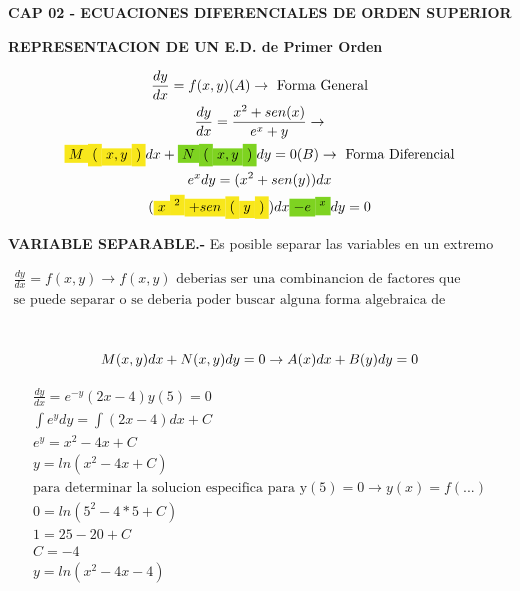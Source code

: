 \documentclass{article}
\begin{document}
\textbf{CAP 02 - ECUACIONES DIFERENCIALES DE ORDEN SUPERIOR}

\textbf{REPRESENTACION DE UN E.D. de Primer Orden}


\begin{gather*}
\frac{dy}{dx} = f(x,y) (A)  \rightarrow \text{ Forma General} \\
\frac{dy}{dx} = \frac{x^{2}+sen(x)}{e^{x}+y} \rightarrow     \\
\text{\colorbox[RGB]{248,231,28}{$M$}}\text{\colorbox[RGB]{248,231,28}{$($}}\text{\colorbox[RGB]{248,231,28}{$x,y$}}\text{\colorbox[RGB]{248,231,28}{$)$}}dx + \text{\colorbox[RGB]{126,211,33}{$N$}}\text{\colorbox[RGB]{126,211,33}{$($}}\text{\colorbox[RGB]{126,211,33}{$x,y$}}\text{\colorbox[RGB]{126,211,33}{$)$}}dy = 0 (B)  \rightarrow \text{ Forma Diferencial} \\
e^{x}dy = (x^{2}+sen(y))dx \\
(\text{\colorbox[RGB]{248,231,28}{$x$}}\text{\colorbox[RGB]{248,231,28}{$^{2}$}}\text{\colorbox[RGB]{248,231,28}{$+sen$}}\text{\colorbox[RGB]{248,231,28}{$($}}\text{\colorbox[RGB]{248,231,28}{$y$}}\text{\colorbox[RGB]{248,231,28}{$)$}})dx \text{\colorbox[RGB]{126,211,33}{$-e$}}\text{\colorbox[RGB]{126,211,33}{$^{x}$}}dy = 0
\end{gather*}




\textbf{VARIABLE SEPARABLE.- }Es posible separar las variables en un extremo\textbf{ }


\begin{gather*}
\frac{dy}{dx} = f(x,y)  \rightarrow  f(x,y)\text{ deberias ser una combinancion de factores que } \\
\text{se puede separar o se deberia poder buscar  alguna forma algebraica de formarlos}
\end{gather*}



\begin{gather*}
\vspace{0.5em} \\
M(x,y)dx + N(x,y)dy = 0  \rightarrow  A(x)dx + B(y)dy =0
\end{gather*}



\begin{gather*}
\frac{dy}{dx} =e^{-y}(2x-4)         y(5)=0 \\
\int e^{y} dy=\int (2x-4)dx +C \\
e^{y}  =x^{2}-4x +C  \\
y = ln(x^{2}-4x +C) \\
\text{para determinar la solucion especifica para y}(5)=0  \rightarrow  y(x) =f(...) \\
0 = ln(5^{2}-4*5 +C) \\
1  =25-20 +C  \\
C =-4 \\
y = ln(x^{2}-4x -4)
\end{gather*}
\end{document}

